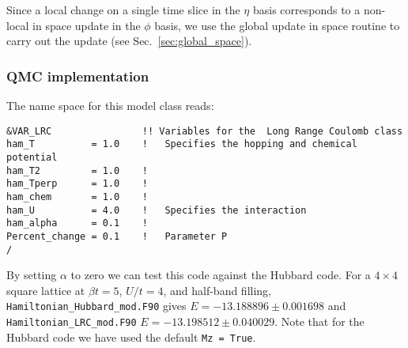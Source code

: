 Since a local change on  a single time slice in the $\eta$ basis corresponds to a non-local in space update  in the $\phi$ basis, we  use the global update in  space routine to carry out the update (see Sec.~\ref{sec:global_space}). 

\subsubsection*{ QMC implementation } 

The name space for this model class  reads: 

\begin{lstlisting}[style=fortran,escapechar=\#,breaklines=true]
&VAR_LRC                !! Variables for the  Long Range Coulomb class
ham_T          = 1.0    !   Specifies the hopping and chemical potential
ham_T2         = 1.0    !   
ham_Tperp      = 1.0    ! 
ham_chem       = 1.0    ! 
ham_U          = 4.0    !   Specifies the interaction
ham_alpha      = 0.1    !
Percent_change = 0.1    !   Parameter P 
/
\end{lstlisting}

By setting $\alpha$ to zero we can test this code against the Hubbard code.   For a   $ 4 \times 4 $ square  lattice at $ \beta t = 5$, $U/t = 4$, and half-band filling,     \texttt{Hamiltonian\_Hubbard\_mod.F90}    gives $ E = -13.188896      \pm  0.001698 $  and
  \texttt{Hamiltonian\_LRC\_mod.F90}  $ E =  -13.198512    \pm  0.040029 $.    Note that for the  Hubbard code we have used  the default \texttt{Mz = True}.     
  



